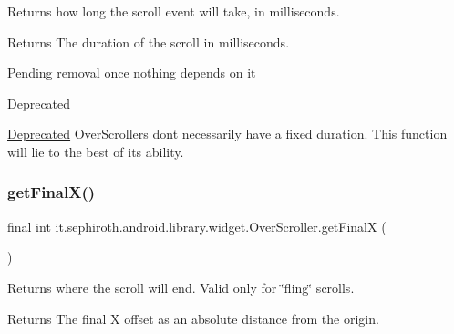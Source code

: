 Returns how long the scroll event will take, in milliseconds.

\begin{DoxyReturn}{Returns}
The duration of the scroll in milliseconds.
\end{DoxyReturn}
Pending removal once nothing depends on it \begin{DoxyRefDesc}{Deprecated}
\item[\hyperlink{deprecated__deprecated000002}{Deprecated}]Over\+Scrollers don\textquotesingle{}t necessarily have a fixed duration. This function will lie to the best of its ability. \end{DoxyRefDesc}
\mbox{\label{classit_1_1sephiroth_1_1android_1_1library_1_1widget_1_1_over_scroller_aef4f42a8798a79dd8402373d10a7563b}} 
\subsubsection{\texorpdfstring{get\+Final\+X()}{getFinalX()}}
{\footnotesize\ttfamily final int it.\+sephiroth.\+android.\+library.\+widget.\+Over\+Scroller.\+get\+FinalX (\begin{DoxyParamCaption}{ }\end{DoxyParamCaption})}

Returns where the scroll will end. Valid only for \char`\"{}fling\char`\"{} scrolls.

\begin{DoxyReturn}{Returns}
The final X offset as an absolute distance from the origin. 
\end{DoxyReturn}
\mbox{\label{classit_1_1sephiroth_1_1android_1_1library_1_1widget_1_1_over_scroller_af5ec55a4d070fc31b1a0a7d453e96123}} 
